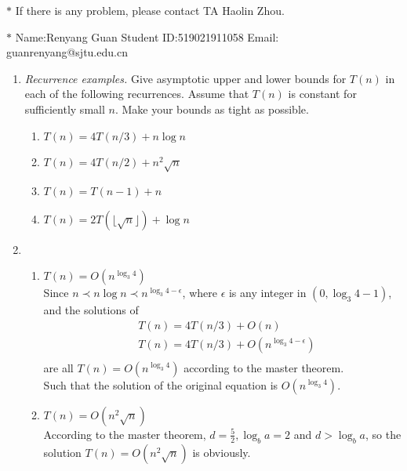 \documentclass[12pt,a4paper]{article}
\makeatletter
\newtheorem*{solution}{Solution}
\theoremstyle{definition}
\renewenvironment{solution}[1][Solution] {\par\pushQED{\qed}\normalfont\topsep6\p@\@plus6\p@\relax\trivlist\item[\hskip\labelsep\bfseries#1\@addpunct{.}]\ignorespaces}{\popQED\endtrivlist\@endpefalse} \makeatother
\makeatother
\begin{document}
\noindent

\noindent{}
\begin{center}
\footnotesize{\color{red}$*$ If there is any problem, please contact TA Haolin Zhou. }

\footnotesize{\color{blue}$*$ Name:Renyang Guan  \quad Student ID:519021911058 \quad Email: guanrenyang@sjtu.edu.cn}
\end{center}

\begin{enumerate}
\item
    \textit{Recurrence examples.} Give asymptotic upper and lower bounds for $T(n)$ in each of the following recurrences. Assume that $T(n)$ is constant for sufficiently small $n$. Make your bounds as tight as possible.
\begin{enumerate}
	\item $T(n)=4 T(n / 3)+n \log n$
	\item $T(n)=4 T(n / 2)+n^{2} \sqrt{n}$
	\item $T(n)=T(n-1)+n$	
	\item $T(n)=2T(\lfloor \sqrt n\rfloor)+\log n$
\end{enumerate}
\begin{solution}
~\\
\begin{enumerate}
\item \emph{$T(n)=O(n^{\log_3 4})$}  \\
Since $n \prec n\log n \prec n^{\log_3 4-\epsilon}$, where $\epsilon$ is any integer in $(0,\log_3 4-1)$, and the solutions of
\begin{equation}
\begin{split}
&T(n)=4 T(n / 3)+O(n)\\
&T(n)=4 T(n / 3)+ O(n^{\log_3 4-\epsilon})\\
\end{split}
\end{equation}
are all $T(n)=O(n^{\log_3 4})$ according to the master theorem.\\
Such that the solution of the original equation is $O(n^{\log_3 4})$.

\item \emph{$T(n)=O(n^2 \sqrt{n})$}\\
According to the master theorem,
$d=\frac{5}{2},\log_b a=2$
and $d>\log_b a$, so the solution $T(n)=O(n^2 \sqrt{n})$ is obviously.


\end{enumerate}
\end{solution}
\end{enumerate}
\end{document}
